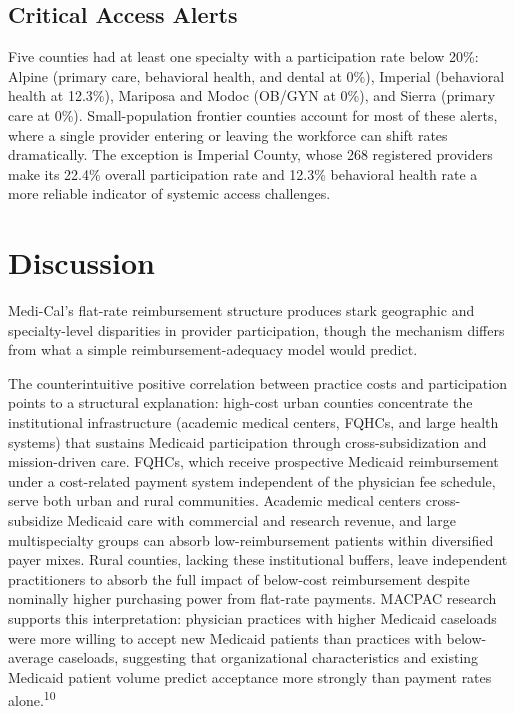 \documentclass[12pt]{article}
\begin{document}
\subsection{Critical Access Alerts}

Five counties had at least one specialty with a participation rate below 20\%: Alpine (primary care, behavioral health, and dental at 0\%), Imperial (behavioral health at 12.3\%), Mariposa and Modoc (OB/GYN at 0\%), and Sierra (primary care at 0\%). Small-population frontier counties account for most of these alerts, where a single provider entering or leaving the workforce can shift rates dramatically. The exception is Imperial County, whose 268 registered providers make its 22.4\% overall participation rate and 12.3\% behavioral health rate a more reliable indicator of systemic access challenges.


\section{Discussion}

Medi-Cal's flat-rate reimbursement structure produces stark geographic and specialty-level disparities in provider participation, though the mechanism differs from what a simple reimbursement-adequacy model would predict.

The counterintuitive positive correlation between practice costs and participation points to a structural explanation: high-cost urban counties concentrate the institutional infrastructure (academic medical centers, FQHCs, and large health systems) that sustains Medicaid participation through cross-subsidization and mission-driven care. FQHCs, which receive prospective Medicaid reimbursement under a cost-related payment system independent of the physician fee schedule, serve both urban and rural communities. Academic medical centers cross-subsidize Medicaid care with commercial and research revenue, and large multispecialty groups can absorb low-reimbursement patients within diversified payer mixes. Rural counties, lacking these institutional buffers, leave independent practitioners to absorb the full impact of below-cost reimbursement despite nominally higher purchasing power from flat-rate payments. MACPAC research supports this interpretation: physician practices with higher Medicaid caseloads were more willing to accept new Medicaid patients than practices with below-average caseloads, suggesting that organizational characteristics and existing Medicaid patient volume predict acceptance more strongly than payment rates alone.\textsuperscript{10}
\end{document}
